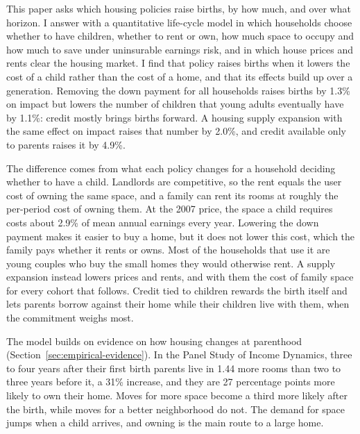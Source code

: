 
This paper asks which housing policies raise births, by how much, and over
what horizon. I answer with a quantitative life-cycle model in which
households choose whether to have children, whether to rent or own, how much
space to occupy and how much to save under uninsurable earnings risk, and in
which house prices and rents clear the housing market. I find that policy
raises births when it lowers the cost of a child rather than the cost of a
home, and that its effects build up over a generation. Removing the down
payment for all households raises births by 1.3\% on impact but lowers the
number of children that young adults eventually have by 1.1\%: credit mostly
brings births forward. A housing supply expansion with the same effect on
impact raises that number by 2.0\%, and credit available only to parents
raises it by 4.9\%.

The difference comes from what each policy changes for a household deciding
whether to have a child. Landlords are competitive, so the rent equals the
user cost of owning the same space, and a family can rent its rooms at
roughly the per-period cost of owning them. At the 2007 price, the space a
child requires costs about 2.9\% of mean annual earnings every year. Lowering
the down payment makes it easier to buy a home, but it does not lower this
cost, which the family pays whether it rents or owns. Most of the households
that use it are young couples who buy the small homes they would otherwise
rent. A supply expansion instead lowers prices and rents, and with them the
cost of family space for every cohort that follows. Credit tied to children
rewards the birth itself and lets parents borrow against their home while
their children live with them, when the commitment weighs most.

The model builds on evidence on how housing changes at parenthood
(Section~\ref{sec:empirical-evidence}). In the Panel Study of Income
Dynamics, three to four years after their first birth parents live in 1.44
more rooms than two to three years before it, a 31\% increase, and they are
27 percentage points more likely to own their home. Moves for more space
become a third more likely after the birth, while moves for a better
neighborhood do not. The demand for space jumps when a child arrives, and
owning is the main route to a large home.

